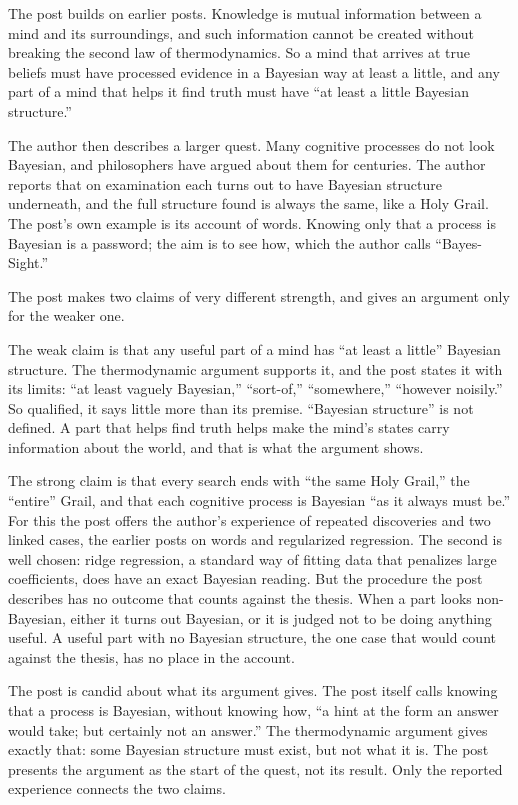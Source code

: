 \begin{afterword}
\summaryhead

The post builds on earlier posts. Knowledge is mutual information between a mind and its surroundings, and such information cannot be created without breaking the second law of thermodynamics. So a mind that arrives at true beliefs must have processed evidence in a Bayesian way at least a little, and any part of a mind that helps it find truth must have ``at least a little Bayesian structure.''

The author then describes a larger quest. Many cognitive processes do not look Bayesian, and philosophers have argued about them for centuries. The author reports that on examination each turns out to have Bayesian structure underneath, and the full structure found is always the same, like a Holy Grail. The post's own example is its account of words. Knowing only that a process is Bayesian is a password; the aim is to see how, which the author calls ``Bayes-Sight.''

\responsehead

The post makes two claims of very different strength, and gives an argument only for the weaker one.

The weak claim is that any useful part of a mind has ``at least a little'' Bayesian structure. The thermodynamic argument supports it, and the post states it with its limits: ``at least vaguely Bayesian,'' ``sort-of,'' ``somewhere,'' ``however noisily.'' So qualified, it says little more than its premise. ``Bayesian structure'' is not defined. A part that helps find truth helps make the mind's states carry information about the world, and that is what the argument shows.

The strong claim is that every search ends with ``the same Holy Grail,'' the ``entire'' Grail, and that each cognitive process is Bayesian ``as it always must be.'' For this the post offers the author's experience of repeated discoveries and two linked cases, the earlier posts on words and regularized regression. The second is well chosen: ridge regression, a standard way of fitting data that penalizes large coefficients, does have an exact Bayesian reading. But the procedure the post describes has no outcome that counts against the thesis. When a part looks non-Bayesian, either it turns out Bayesian, or it is judged not to be doing anything useful. A useful part with no Bayesian structure, the one case that would count against the thesis, has no place in the account.

The post is candid about what its argument gives. The post itself calls knowing that a process is Bayesian, without knowing how, ``a hint at the form an answer would take; but certainly not an answer.'' The thermodynamic argument gives exactly that: some Bayesian structure must exist, but not what it is. The post presents the argument as the start of the quest, not its result. Only the reported experience connects the two claims.


\end{afterword}
